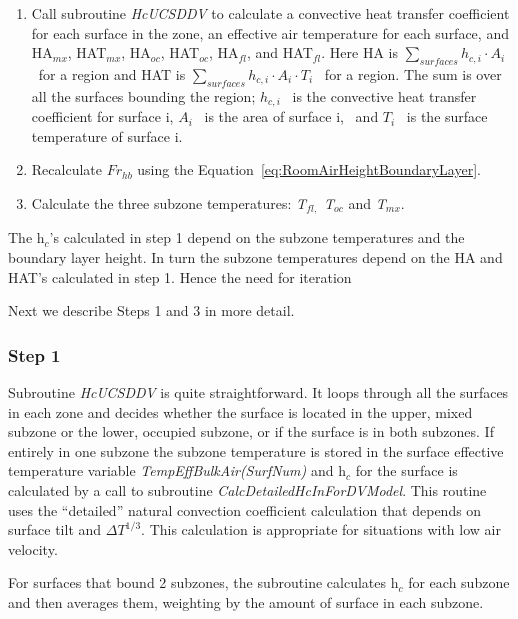 {\begin{enumerate}
\item Call subroutine \emph{HcUCSDDV} to calculate a convective heat transfer coefficient for each surface in the zone, an effective air temperature for each surface, and HA\(_{mx}\), HAT\(_{mx}\), HA\(_{oc}\), HAT\(_{oc}\), HA\(_{fl}\), and HAT\(_{fl}\). Here HA is \(\sum\limits_{surfaces} {{h_{c,i}}} \cdot {A_i}\) ~for a region and HAT is \(\sum\limits_{surfaces} {{h_{c,i}}} \cdot {A_i} \cdot {T_i}\) ~for a region. The sum is over all the surfaces bounding the region; \({h_{c,i}}\) ~is the convective heat transfer coefficient for surface i, \({A_i}\) ~is the area of surface i,~ and \({T_i}\) ~is the surface temperature of surface i.
\item Recalculate \(F{r_{hb}}\) using the Equation~\ref{eq:RoomAirHeightBoundaryLayer}.
\item Calculate the three subzone temperatures: \emph{T\(_{fl,}\) T\(_{oc}\)} and \emph{T\(_{mx}\)}.
\end{enumerate}

The h\(_{c}\)'s calculated in step 1 depend on the subzone temperatures and the boundary layer height. In turn the subzone temperatures depend on the HA and HAT's calculated in step 1. Hence the need for iteration

Next we describe Steps 1 and 3 in more detail.

\subsubsection{Step 1}\label{step-1}

Subroutine \emph{HcUCSDDV} is quite straightforward. It loops through all the surfaces in each zone and decides whether the surface is located in the upper, mixed subzone or the lower, occupied subzone, or if the surface is in both subzones. If entirely in one subzone the subzone temperature is stored in the surface effective temperature variable \emph{TempEffBulkAir(SurfNum)} and h\(_{c}\) for the surface is calculated by a call to subroutine \emph{CalcDetailedHcInForDVModel}. This routine uses the ``detailed'' natural convection coefficient calculation that depends on surface tilt and \(\Delta {T^{1/3}}\). This calculation is appropriate for situations with low air velocity.

For surfaces that bound 2 subzones, the subroutine calculates h\(_{c}\) for each subzone and then averages them, weighting by the amount of surface in each subzone.

}
